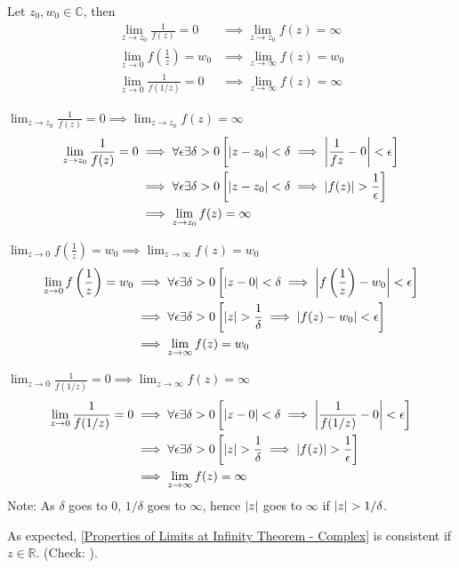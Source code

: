\documentclass[12pt, english]{book}
\makeatletter
\renewenvironment{proof}[1][\proofname]{\par
	\pushQED{\qed}%
	\normalfont \topsep6\p@\@plus6\p@\relax
	\list{}{%
		\settowidth{\leftmargin}{\itshape\proofname:\hskip\labelsep}%
		\setlength{\labelwidth}{0pt}%
		\setlength{\itemindent}{-\leftmargin}%
	}%
	\item[\hskip\labelsep\itshape#1\@addpunct{:}]\ignorespaces
	}{ \popQED\endlist\@endpefalse}
\makeatother
\begin{document}
	\begin{theorem}
		\label{Properties of Limits at Infinity Theorem - Complex}
		Let $z_0, w_0 \in \mathbb{C}$, then
		\begin{align*}
			\lim_{z \rightarrow z_0} \frac{1}{f(z)} = 0
			&\implies \lim_{z \rightarrow z_0} f(z) = \infty \\
			\lim_{z \rightarrow 0} f\left(\frac{1}{z}\right) = w_0
			&\implies \lim_{z \rightarrow \infty} f(z) = w_0 \\
			\lim_{z \rightarrow 0} \frac{1}{f(1/z)} = 0 
			&\implies \lim_{z \rightarrow \infty} f(z) = \infty
		\end{align*}
	\end{theorem}
	\begin{proof}
		\underline{$\lim_{z \rightarrow z_0} \frac{1}{f(z)} = 0 
		\implies \lim_{z \rightarrow z_0} f(z) = \infty$}
		\begin{align*}
			\lim_{z \rightarrow z_0} \frac{1}{f(z)} = 0 
			&\implies \forall \epsilon \exists \delta>0 \left[\abs{z-z_0} < \delta \implies \abs{\frac{1}{f{z}} - 0} < \epsilon \right] \\
			&\implies \forall \epsilon \exists \delta>0 \left[\abs{z-z_0} < \delta \implies \abs{f(z)} > \frac{1}{\epsilon} \right]  \\
			&\implies \lim_{z \rightarrow z_0} f(z) = \infty 
		\end{align*}
	
		\underline{$\lim_{z \rightarrow 0} f\left(\frac{1}{z}\right) = w_0
		\implies \lim_{z \rightarrow \infty} f(z) = w_0$}
		\begin{align*}
			\lim_{z \rightarrow 0} f\left(\frac{1}{z}\right) = w_0
			&\implies \forall \epsilon \exists \delta>0 \left[ \abs{z-0} < \delta \implies \abs{f\left(\frac{1}{z}\right) - w_0} < \epsilon \right] \\
			&\implies \forall \epsilon \exists \delta>0 \left[ \abs{z} > \frac{1}{\delta} \implies \abs{f(z) - w_0} < \epsilon \right] \\
			&\implies \lim_{z \rightarrow \infty} f(z) = w_0
		\end{align*}
	
		\underline{$\lim_{z \rightarrow 0} \frac{1}{f(1/z)} = 0 
		\implies \lim_{z \rightarrow \infty} f(z) = \infty$}
		\begin{align*}
			\lim_{z \rightarrow 0} \frac{1}{f(1/z)} = 0 
			&\implies \forall \epsilon \exists \delta > 0 \left[ \abs{z - 0} < \delta \implies \abs{\frac{1}{f(1/z)} - 0} < \epsilon \right] \\
			&\implies \forall \epsilon \exists \delta > 0 \left[ \abs{z} > \frac{1}{\delta} \implies \abs{f(z)} > \frac{1}{\epsilon} \right] \\
			&\implies \lim_{z \rightarrow \infty} f(z) = \infty 
		\end{align*}
	\end{proof}
	Note: As $\delta$ goes to $0$, $1/\delta$ goes to $\infty$, hence $\abs{z}$ goes to $\infty$ if $\abs{z} > 1/\delta$. 
	\begin{observation}
		As expected, \cref{Properties of Limits at Infinity Theorem - Complex} is consistent if $z \in \mathbb{R}$. (Check: ).
	\end{observation}
	
\end{document}
